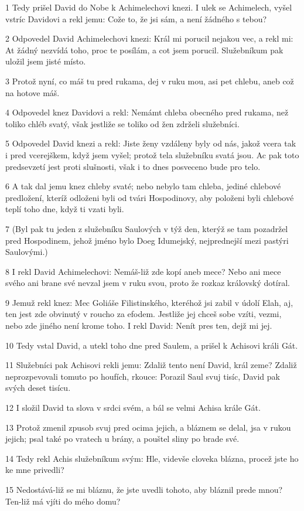 \par 1 Tedy prišel David do Nobe k Achimelechovi knezi. I ulek se Achimelech, vyšel vstríc Davidovi a rekl jemu: Cože to, že jsi sám, a není žádného s tebou?
\par 2 Odpovedel David Achimelechovi knezi: Král mi porucil nejakou vec, a rekl mi: At žádný nezvídá toho, proc te posílám, a cot jsem porucil. Služebníkum pak uložil jsem jisté místo.
\par 3 Protož nyní, co máš tu pred rukama, dej v ruku mou, asi pet chlebu, aneb což na hotove máš.
\par 4 Odpovedel knez Davidovi a rekl: Nemámt chleba obecného pred rukama, než toliko chléb svatý, však jestliže se toliko od žen zdrželi služebníci.
\par 5 Odpovedel David knezi a rekl: Jiste ženy vzdáleny byly od nás, jakož vcera tak i pred vcerejškem, když jsem vyšel; protož tela služebníku svatá jsou. Ac pak toto predsevzetí jest proti slušnosti, však i to dnes posveceno bude pro telo.
\par 6 A tak dal jemu knez chleby svaté; nebo nebylo tam chleba, jediné chlebové predložení, kteríž odloženi byli od tvári Hospodinovy, aby položeni byli chlebové teplí toho dne, když ti vzati byli.
\par 7 (Byl pak tu jeden z služebníku Saulových v týž den, kterýž se tam pozadržel pred Hospodinem, jehož jméno bylo Doeg Idumejský, nejprednejší mezi pastýri Saulovými.)
\par 8 I rekl David Achimelechovi: Nemáš-liž zde kopí aneb mece? Nebo ani mece svého ani brane své nevzal jsem v ruku svou, proto že rozkaz královský dotíral.
\par 9 Jemuž rekl knez: Mec Goliáše Filistinského, kteréhož jsi zabil v údolí Elah, aj, ten jest zde obvinutý v roucho za efodem. Jestliže jej chceš sobe vzíti, vezmi, nebo zde jiného není krome toho. I rekl David: Nenít pres ten, dejž mi jej.
\par 10 Tedy vstal David, a utekl toho dne pred Saulem, a prišel k Achisovi králi Gát.
\par 11 Služebníci pak Achisovi rekli jemu: Zdaliž tento není David, král zeme? Zdaliž neprozpevovali tomuto po houfích, rkouce: Porazil Saul svuj tisíc, David pak svých deset tisícu.
\par 12 I složil David ta slova v srdci svém, a bál se velmi Achisa krále Gát.
\par 13 Protož zmenil zpusob svuj pred ocima jejich, a bláznem se delal, jsa v rukou jejich; psal také po vratech u brány, a pouštel sliny po brade své.
\par 14 Tedy rekl Achis služebníkum svým: Hle, videvše cloveka blázna, procež jste ho ke mne privedli?
\par 15 Nedostává-liž se mi bláznu, že jste uvedli tohoto, aby bláznil prede mnou? Ten-liž má vjíti do mého domu?

